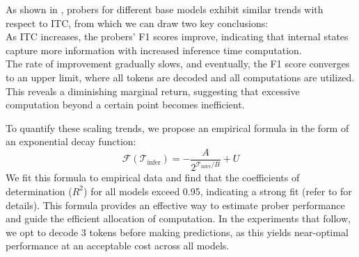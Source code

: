 As shown in , probers for different base models exhibit similar trends with respect to ITC, from which we can draw two key conclusions:\\
\textbullet \hspace{3pt} As ITC increases, the probers' F1 scores improve, indicating that internal states capture more information with increased inference time computation.\\
\textbullet \hspace{3pt} The rate of improvement gradually slows, and eventually, the F1 score converges to an upper limit, where all tokens are decoded and all computations are utilized. This reveals a diminishing marginal return, suggesting that excessive computation beyond a certain point becomes inefficient.

To quantify these scaling trends, we propose an empirical formula in the form of an exponential decay function:
\begin{equation}\label{eq:fit_curve}
\mathcal{F}(\mathcal{T}_{\text{infer}})=-\frac{A}{2^{\mathcal{T}_{\text{infer}}/B}}+U
\end{equation}
We fit this formula to empirical data and find that the coefficients of determination ($R^2$) for all models exceed 0.95, indicating a strong fit (refer to  for details). This formula provides an effective way to estimate prober performance and guide the efficient allocation of computation. In the experiments that follow, we opt to decode 3 tokens before making predictions, as this yields near-optimal performance at an acceptable cost across all models.





